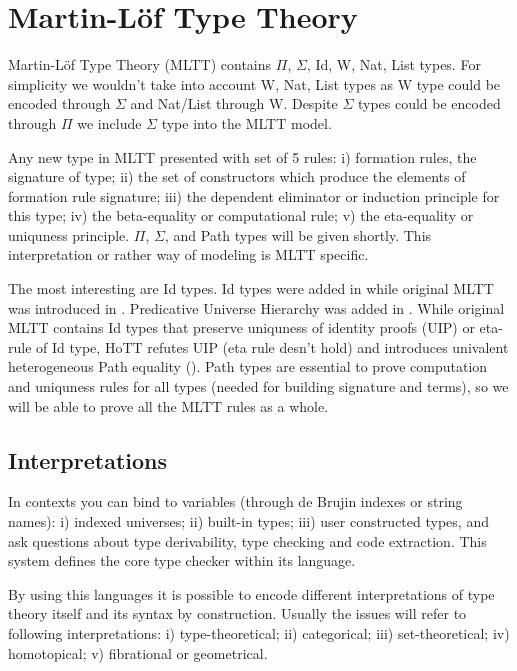 \documentclass[twocolumn,10pt]{article}
\theoremstyle{definition}
\begin{document}
\section{Martin-Löf Type Theory}

Martin-Löf Type Theory (MLTT) contains $\Pi$, $\Sigma$, Id, W, Nat, List types.
For simplicity we wouldn't take into account W, Nat, List types as
W type could be encoded through $\Sigma$ and Nat/List through W.
Despite $\Sigma$ types could be encoded through $\Pi$ we include $\Sigma$ type into the MLTT model.

Any new type in MLTT presented with set of 5 rules: i) formation rules, the signature of type;
ii) the set of constructors which produce the elements of formation rule signature;
iii) the dependent eliminator or induction principle for this type;
iv) the beta-equality or computational rule;
v) the eta-equality or uniquness principle. $\Pi$, $\Sigma$, and Path
types will be given shortly. This interpretation or rather way of modeling is MLTT specific.

The most interesting are Id types. Id types were added in \cite{Lof84} while original MLTT was introduced in \cite{Lof72}.
Predicative Universe Hierarchy was added in \cite{Lof75}.
While original MLTT contains Id types that preserve uniquness of identity
proofs (UIP) or eta-rule of Id type, HoTT refutes UIP (eta rule desn't hold)
and introduces univalent heterogeneous Path equality (\cite{Hofmann96}).
Path types are essential to prove computation and uniquness rules for all types
(needed for building signature and terms), so we will be able to prove all
the MLTT rules as a whole.

\subsection{Interpretations}

In contexts you can bind to variables (through de Brujin indexes or string names):
i) indexed universes; ii) built-in types; iii) user constructed types, and ask
questions about type derivability, type checking and code extraction. This system
defines the core type checker within its language.

By using this languages it is possible to encode different interpretations of
type theory itself and its syntax by construction. Usually the issues will refer to
following interpretations: i) type-theoretical; ii) categorical;
iii) set-theoretical; iv) homotopical; v) fibrational or geometrical.
\end{document}
